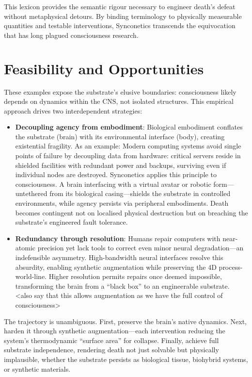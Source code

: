 \documentclass[10pt]{article}
\begin{document}
\begin{sloppypar}
  This lexicon provides the semantic rigour necessary to engineer death’s defeat without metaphysical detours. By binding terminology to physically measurable quantities and testable interventions, Synconetics transcends the equivocation that has long plagued consciousness research.


  \section{Feasibility and Opportunities}
  \label{sec:feasibility}

  These examples expose the substrate’s elusive boundaries: consciousness likely depends on dynamics within the CNS, not isolated structures. This empirical approach drives two interdependent strategies:

  \begin{itemize}
    \item \textbf{Decoupling agency from embodiment}: Biological embodiment conflates the substrate (brain) with its environmental interface (body), creating existential fragility. As an example: Modern computing systems avoid single points of failure by decoupling data from hardware: critical servers reside in shielded facilities with redundant power and backups, surviving even if individual nodes are destroyed. Synconetics applies this principle to consciousness. A brain interfacing with a virtual avatar or robotic form—untethered from its biological casing—shields the substrate in controlled environments, while agency persists via peripheral embodiments. Death becomes contingent not on localised physical destruction but on breaching the substrate’s engineered fault tolerance.
    \item \textbf{Redundancy through resolution}: Humans repair computers with near-atomic precision yet lack tools to correct even minor neural degradation—an indefensible asymmetry. High-bandwidth neural interfaces resolve this absurdity, enabling synthetic augmentation while preserving the 4D process-world-line. Higher resolution permits repairs once deemed impossible, transforming the brain from a “black box” to an engineerable substrate. <also say that this allows augmentation as we have the full control of consciousness>
  \end{itemize}

  The trajectory is unambiguous. First, preserve the brain’s native dynamics. Next, harden it through synthetic augmentation—each intervention reducing the system’s thermodynamic “surface area” for collapse. Finally, achieve full substrate independence, rendering death not just solvable but physically implausible, whether the substrate persists as biological tissue, biohybrid systems, or synthetic materials.


\end{sloppypar}
\end{document}
